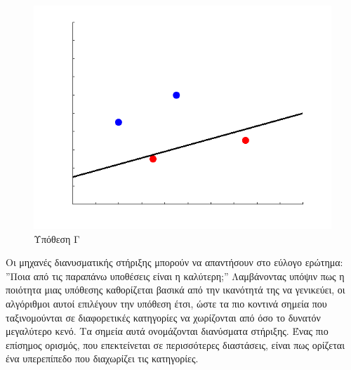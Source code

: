 \documentclass{article}
\begin{document}
\begin{figure}[H]
\begin{minipage}{0.333\textwidth}
    \end{minipage}
     \begin{minipage}{0.333\textwidth}
        \centering
        \includegraphics[width=\linewidth, height=0.15\textheight]{svm_line3.png}
        \caption[Υπόθεση Γ μηχανής διανυσματικής στήριξης]{Υπόθεση Γ}
       
    \end{minipage}
\end{figure}
Οι μηχανές διανυσματικής στήριξης μπορούν να απαντήσουν στο εύλογο ερώτημα: ”Ποια από τις παραπάνω υποθέσεις είναι η καλύτερη;” Λαμβάνοντας υπόψιν πως η ποιότητα μιας υπόθεσης καθορίζεται βασικά από την ικανότητά της να γενικεύει, οι αλγόριθμοι αυτοί επιλέγουν την υπόθεση έτσι, ώστε τα πιο κοντινά σημεία που ταξινομούνται σε διαφορετικές κατηγορίες να χωρίζονται από όσο το δυνατόν
μεγαλύτερο κενό. Τα σημεία αυτά ονομάζονται διανύσματα στήριξης. Ένας πιο επίσημος ορισμός, που επεκτείνεται σε περισσότερες διαστάσεις, είναι πως ορίζεται ένα υπερεπίπεδο που διαχωρίζει τις κατηγορίες.
\end{document}
